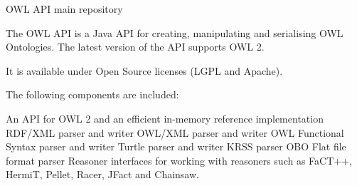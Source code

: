 O\-W\-L A\-P\-I main repository

The O\-W\-L A\-P\-I is a Java A\-P\-I for creating, manipulating and serialising O\-W\-L Ontologies. The latest version of the A\-P\-I supports O\-W\-L 2.

It is available under Open Source licenses (L\-G\-P\-L and Apache).

The following components are included\-:

An A\-P\-I for O\-W\-L 2 and an efficient in-\/memory reference implementation R\-D\-F/\-X\-M\-L parser and writer O\-W\-L/\-X\-M\-L parser and writer O\-W\-L Functional Syntax parser and writer Turtle parser and writer K\-R\-S\-S parser O\-B\-O Flat file format parser Reasoner interfaces for working with reasoners such as Fa\-C\-T++, Hermi\-T, Pellet, Racer, J\-Fact and Chainsaw. 